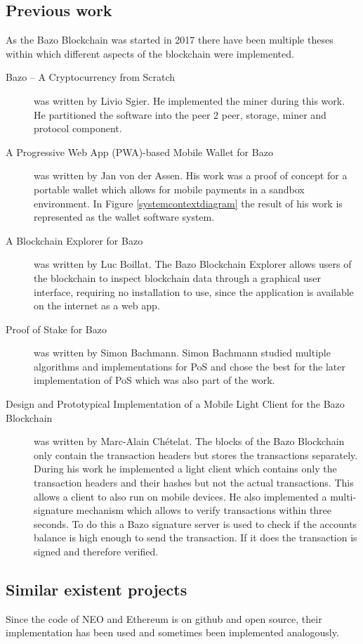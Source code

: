 \subsection{Previous work}
As the Bazo Blockchain was started in 2017 there have been multiple theses within which different aspects of the blockchain were implemented. 
\begin{description}
	\item [Bazo – A Cryptocurrency from Scratch \cite{ba_miner}] was written by Livio Sgier. He implemented the miner during this work. He partitioned the software into the peer 2 peer, storage, miner and protocol \gls{component}.
	\item [A Progressive Web App (PWA)-based Mobile Wallet for Bazo \cite{ba_wallet}] was written by Jan von der Assen. His work was a proof of concept for a portable wallet which allows for mobile payments in a sandbox environment. In Figure \ref{systemcontextdiagram} the result of his work is represented as the wallet software system.
	\item [A Blockchain Explorer for Bazo \cite{ba_explorer}] was written by Luc Boillat. The Bazo Blockchain Explorer allows users of the blockchain to inspect blockchain data through a graphical user interface, requiring no installation to use, since the application is available on the internet as a web app. \cite{ba_explorer}
	\item [Proof of Stake for Bazo \cite{ba_pos}] was written by Simon Bachmann. Simon Bachmann studied multiple algorithms and implementations for PoS and chose the best for the later implementation of PoS which was also part of the work.
	\item [Design and Prototypical Implementation of a Mobile Light Client for the Bazo Blockchain \cite{ba_client}] was written by Marc-Alain Chételat. The blocks of the Bazo Blockchain only contain the transaction headers but stores the transactions separately. During his work he implemented a light client which contains only the transaction headers and their hashes but not the actual transactions. This allows a client to also run on mobile devices. He also 	implemented a multi-signature mechanism which allows to verify transactions within three seconds.  To do this a Bazo signature server is used to check if the accounts balance is high enough to send the transaction. If it does the transaction is signed and therefore verified. 
\end{description}

\subsection{Similar existent projects}
Since the code of NEO and Ethereum is on github and open source, their implementation has been used and sometimes been implemented analogously. 

